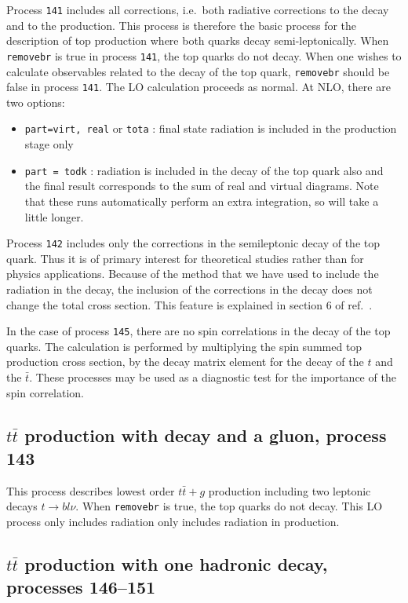 \documentclass{article}
\begin{document}
{{{{{{Process {\tt 141} includes all corrections, i.e.\ both radiative corrections
to the decay and to the production. This process is therefore the
basic process for the description of top production where both quarks
decay semi-leptonically.  When {\tt removebr} is true in process {\tt 141},
the top quarks do not decay.
When one wishes to calculate observables related to the decay of the top
quark, {\tt removebr} should be false in process {\tt 141}.
The LO calculation proceeds as normal. 
At NLO, there are two options:
\begin{itemize}
\item {\tt part=virt, real} or {\tt tota} : final state radiation is included
in the production stage only
\item {\tt part = todk} : radiation is included in the decay of the top
quark also and the final result corresponds to the sum of real and virtual
diagrams. 
Note that these runs automatically perform an extra integration, so
will take a little longer.
\end{itemize}

Process {\tt 142} includes only the corrections in
the semileptonic decay of the top quark. Thus it is of primary
interest for theoretical studies rather than for physics applications.  
Because of the method that we have used to include the radiation in the decay,
the inclusion of the corrections in the decay does not change the
total cross section. This feature is explained in section 6 of ref.~\cite{Campbell:2012uf}.

In the case of process {\tt 145}, there are no spin correlations in
the decay of the top quarks. The calculation is performed by
multiplying the spin summed top production cross section, by the decay
matrix element for the decay of the $t$ and the $\bar{t}$. These
processes may be used as a diagnostic test for the importance of the
spin correlation.



\subsection{$t\bar{t}$ production with decay and a gluon, process 143}
This process describes lowest order $t \bar{t}+g$ production 
including two leptonic decays $t \to b l \nu$. 
When {\tt removebr} is true, the top quarks do not decay.
This LO process only includes radiation only includes radiation in production.

\subsection{$t\bar{t}$ production with one hadronic decay, processes 146--151}

}}}}}}
\end{document}
